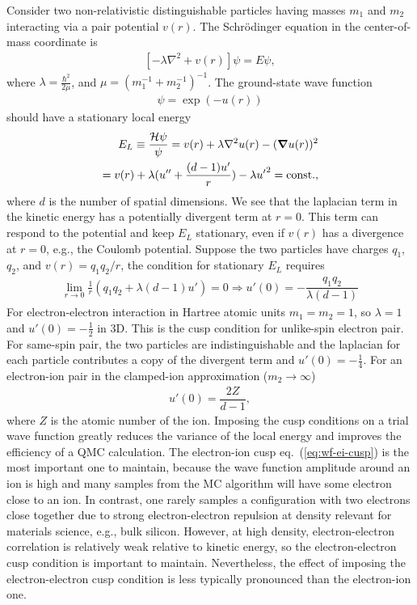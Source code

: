 Consider two non-relativistic distinguishable particles having masses $m_1$ and $m_2$ interacting via a pair potential $v(r)$. The Schr\"odinger equation in the center-of-mass coordinate is
\begin{align}
\left[-\lambda\nabla^2 + v(r)\right] \psi = E\psi,
\end{align}
where $\lambda=\frac{\hbar^2}{2\mu}$, and $\mu=(m_1^{-1}+m_2^{-1})^{-1}$. The ground-state wave function
\begin{align}
\psi = \exp(-u(r))
\end{align}
should have a stationary local energy
\begin{align} \label{eq:wf-cusp}
E_L \equiv \dfrac{\mathcal{H}\psi}{\psi} = v(r) + \lambda\nabla^2u(r) - (\boldsymbol{\nabla}u(r))^2 \nonumber \\
= v(r) + \lambda (u''+\frac{(d-1)u'}{r}) - \lambda {u'}^2 = \text{const.},
\end{align}
where $d$ is the number of spatial dimensions.
We see that the laplacian term in the kinetic energy has a potentially divergent term at $r=0$.
This term can respond to the potential and keep $E_L$ stationary, even if $v(r)$ has a divergence at $r=0$, e.g., the Coulomb potential. Suppose the two particles have charges $q_1$, $q_2$, and $v(r)=q_1q_2/r$, the condition for stationary $E_L$ requires
\begin{align}
\lim\limits_{r\rightarrow 0}\frac{1}{r} (q_1q_2+ \lambda (d-1) u')=0 \Rightarrow u'(0) = -\dfrac{q_1q_2}{\lambda (d-1)}
\end{align}
For electron-electron interaction in Hartree atomic units $m_1=m_2=1$, so $\lambda=1$ and $u'(0)=-\frac{1}{2}$ in 3D. This is the cusp condition for unlike-spin electron pair. For same-spin pair, the two particles are indistinguishable and the laplacian for each particle contributes a copy of the divergent term and $u'(0)=-\frac{1}{4}$. For an electron-ion pair in the clamped-ion approximation ($m_2\rightarrow\infty$)
\begin{align} \label{eq:wf-ei-cusp}
u'(0) = \dfrac{2Z}{d-1},
\end{align}
where $Z$ is the atomic number of the ion. Imposing the cusp conditions on a trial wave function greatly reduces the variance of the local energy and improves the efficiency of a QMC calculation. The electron-ion cusp eq.~(\ref{eq:wf-ei-cusp}) is the most important one to maintain, because the wave function amplitude around an ion is high and many samples from the MC algorithm will have some electron close to an ion. In contrast, one rarely samples a configuration with two electrons close together due to strong electron-electron repulsion at density relevant for materials science, e.g., bulk silicon. However, at high density, electron-electron correlation is relatively weak relative to kinetic energy, so the electron-electron cusp condition is important to maintain. Nevertheless, the effect of imposing the electron-electron cusp condition is less typically pronounced than the electron-ion one.

